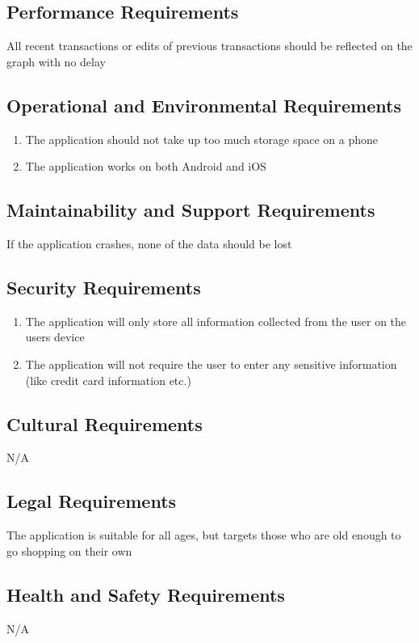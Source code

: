 \documentclass[12pt, titlepage]{article}
\begin{document}
\subsection{Performance Requirements}
All recent transactions or edits of previous transactions should be reflected on the graph with no delay

\subsection{Operational and Environmental Requirements}
   \begin{enumerate}
     \item The application should not take up too much storage space on a phone
     \item The application works on both Android and iOS
   \end{enumerate}

\subsection{Maintainability and Support Requirements}
If the application crashes, none of the data should be lost

\subsection{Security Requirements}
   \begin{enumerate}
     \item The application will only store all information collected from the user on the users device 
     \item The application will not require the user to enter any sensitive information (like credit card information etc.)
   \end{enumerate}
\subsection{Cultural Requirements}
N/A
\subsection{Legal Requirements}
 The application is suitable for all ages, but targets those who are old enough to go shopping on their own
\subsection{Health and Safety Requirements}
N/A
\end{document}
